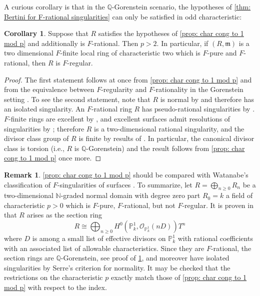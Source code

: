 \documentclass[reqno,11pt]{amsart}
\numberwithin{equation}{section}
\theoremstyle{definition}
\theoremstyle{definition}
\newtheorem{corollary}[theorem]{Corollary}
\theoremstyle{definition}
\newtheorem{remark}[theorem]{Remark}
\theoremstyle{remark}
\newcommand{\N}{\mathbb{N}}
\newcommand{\Q}{\mathbb{Q}}
\newcommand{\PP}{\mathbb{P}}
\newcommand{\fm}{\mathfrak{m}}
\newcommand{\cO}{\mathcal{O}}
\begin{document}
A curious corollary is that in the $\Q$-Gorenstein scenario, the hypotheses of \cref{thm: Bertini for F-rational singularities} can only be satisfied in odd characteristic:
\begin{corollary}\label{cor:f-rational-not-f-regular}
    Suppose that $R$ satisfies the hypotheses of \cref{prop: char cong to 1 mod p} and additionally is $F$-rational. Then $p>2$. In particular, if $(R,\fm)$ is a two dimensional $F$-finite local ring of characteristic two which is $F$-pure and $F$-rational, then $R$ is $F$-regular.
\end{corollary}
\begin{proof}
    The first statement follows at once from \cref{prop: char cong to 1 mod p} and from the equivalence between $F$-regularity and $F$-rationality in the Gorenstein setting \cite[Theorem 4.2(g)]{HH94a}. To see the second statement, note that $R$ is normal by \cite[Theorem 4.2(b)]{HH94a} and therefore has an isolated singularity. An $F$-rational ring $R$ has pseudo-rational singularities by \cite{Smi97}. $F$-finite rings are excellent by \cite{Kun76}, and excellent surfaces admit resolutions of singularities by \cite{Lip78}; therefore $R$ is a two-dimensional rational singularity, and the divisor class group of $R$ is finite by results of \cite{Lip69}. In particular, the canonical divisor class is torsion (i.e., $R$ is $\Q$-Gorenstein) and the result follows from \cref{prop: char cong to 1 mod p} once more.
\end{proof}

\begin{remark}\cref{prop: char cong to 1 mod p} should be compared with Watanabe's classification of $F$-singularities of surfaces \cite{Wat91}. To summarize, let $R = \bigoplus_{n\geq 0}R_n$ be a two-dimensional $\N$-graded normal domain with degree zero part $R_0 = k$ a field of characteristic $p>0$ which is $F$-pure, $F$-rational, but not $F$-regular. It is proven in \cite[Theorem 4.2(2ii)]{Wat91} that $R$ arises as the section ring $$R\cong \bigoplus_{n\geq 0}H^0(\PP^1_k,\cO_{\PP^1_k}(nD)) T^n$$ where $D$ is among a small list of effective divisors on $\PP^1_k$ with rational coefficients with an associated list of allowable characteristics. Since they are $F$-rational, the section rings are $\Q$-Gorenstein, see proof of \cref{cor:f-rational-not-f-regular}, and moreover have isolated singularities by Serre's criterion for normality. It may be checked that the restrictions on the characteristic $p$ exactly match those of \cref{prop: char cong to 1 mod p} with respect to the index.
\end{remark}





\printbibliography
\end{document}

